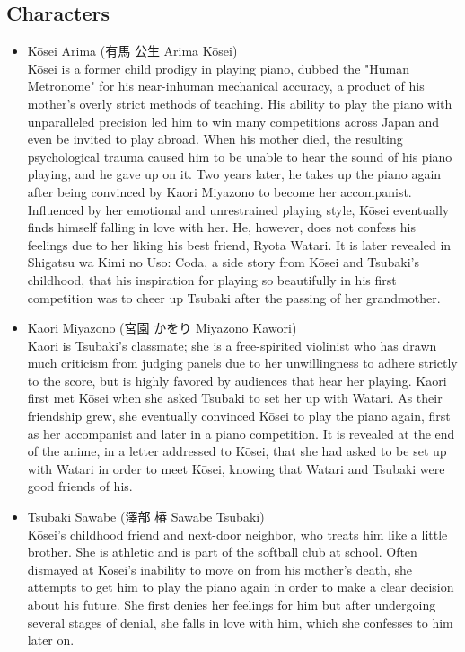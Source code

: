\documentclass[a4paper,10pt]{article}
\begin{document}
\begin{CJK}{UTF8}{min}
\newpage
\subsection{Characters}
\begin{itemize}
\item{Kōsei Arima (有馬 公生 Arima Kōsei)}\\
    Kōsei is a former child prodigy in playing piano, dubbed the "Human Metronome" for his near-inhuman mechanical accuracy, a product of his mother's overly strict methods of teaching. His ability to play the piano with unparalleled precision led him to win many competitions across Japan and even be invited to play abroad. When his mother died, the resulting psychological trauma caused him to be unable to hear the sound of his piano playing, and he gave up on it. Two years later, he takes up the piano again after being convinced by Kaori Miyazono to become her accompanist. Influenced by her emotional and unrestrained playing style, Kōsei eventually finds himself falling in love with her. He, however, does not confess his feelings due to her liking his best friend, Ryota Watari.
    It is later revealed in Shigatsu wa Kimi no Uso: Coda, a side story from Kōsei and Tsubaki's childhood, that his inspiration for playing so beautifully in his first competition was to cheer up Tsubaki after the passing of her grandmother.\\
    
\item{Kaori Miyazono (宮園 かをり Miyazono Kawori)}\\ 
Kaori is Tsubaki's classmate; she is a free-spirited violinist who has drawn much criticism from judging panels due to her unwillingness to adhere strictly to the score, but is highly favored by audiences that hear her playing. Kaori first met Kōsei when she asked Tsubaki to set her up with Watari. As their friendship grew, she eventually convinced Kōsei to play the piano again, first as her accompanist and later in a piano competition. It is revealed at the end of the anime, in a letter addressed to Kōsei, that she had asked to be set up with Watari in order to meet Kōsei, knowing that Watari and Tsubaki were good friends of his.\\

\item{Tsubaki Sawabe (澤部 椿 Sawabe Tsubaki)}\\
Kōsei's childhood friend and next-door neighbor, who treats him like a little brother. She is athletic and is part of the softball club at school. Often dismayed at Kōsei's inability to move on from his mother's death, she attempts to get him to play the piano again in order to make a clear decision about his future. She first denies her feelings for him but after undergoing several stages of denial, she falls in love with him, which she confesses to him later on.\\


\end{itemize}
\end{CJK}
\end{document}
